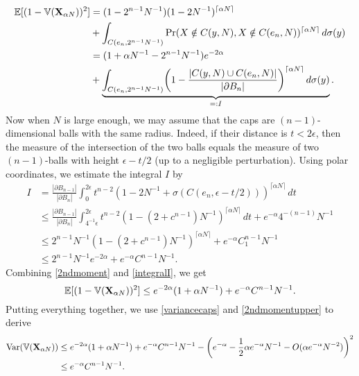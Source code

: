     \begin{align}\label{2ndmoment}
        \E[(1-\mathbb{V}(\mathbf{X}_{\alpha N}))^2] &= (1-2^{n-1}N^{-1})(1-2N^{-1})^{\lceil\alpha N\rceil} \nonumber\\
&+ \int_{C(e_n,2^{n-1}N^{-1})}\Pr( X \notin C(y,N), X \notin C(e_n,N))^{\lceil\alpha N\rceil}\,d\sigma(y)  
       \nonumber \\
       & = (1+\alpha N^{-1}-2^{n-1}N^{-1})e^{-2\alpha} \nonumber\\
&+ \underbrace{\int_{C(e_n,2^{n-1}N^{-1})}\left(1 - \frac{| C(y,N) \cup C(e_n,N) |}{|\partial B_n|}\right)^{\lceil\alpha N\rceil}\,d\sigma(y)}_{=:I}.
    \end{align}
    Now when $N$ is large enough, we may assume that the caps are $(n-1)$-dimensional balls with the same radius. Indeed, if their distance is $t < 2\epsilon$, then the measure of the intersection of the two balls equals the measure of two $(n-1)$-balls with height $\epsilon - t/2$ (up to a negligible perturbation). Using polar coordinates, we  estimate the  integral $I$ by
    \begin{align}\label{integralI}
         I &=  \frac{|\partial B_{n-1}|}{|\partial B_n|}\int_{0}^{2\epsilon}t^{n-2}(1-2N^{-1}+\sigma(C(e_n,\epsilon-t/2)))^{\lceil\alpha N\rceil}\, dt
        \nonumber \\& \leq  \frac{|\partial B_{n-1}|}{|\partial B_n|}\int_{4^{-1}\epsilon}^{2\epsilon} t^{n-2}(1-(2+c^{n-1})N^{-1})^{\lceil\alpha N\rceil}\,dt + e^{-\alpha}4^{-(n-1)}N^{-1}
       \nonumber\\& \leq    2^{n-1}N^{-1}(1-(2+ c^{n-1})N^{-1})^{\lceil\alpha N\rceil}+e^{-\alpha}C_1^{n-1}N^{-1} 
       \nonumber\\&\leq 2^{n-1}N^{-1}e^{-2\alpha} + e^{-\alpha}C^{n-1}N^{-1}. 
    \end{align}
  Combining \eqref{2ndmoment} and \eqref{integralI}, we get 
    \begin{equation}\label{2ndmomentupper}
        \E[(1-\mathbb{V}(\mathbf{X}_{\alpha N}))^2] \leq e^{-2\alpha}(1+\alpha N^{-1}) + e^{-\alpha}C^{n-1}N^{-1}. %
    \end{equation}
    Putting everything together, we use \eqref{variancecaps} and \eqref{2ndmomentupper} to derive 
    \begin{align*}
\var(\mathbb{V}(\mathbf{X}_{\alpha N}))%
&\leq e^{-2\alpha}(1+\alpha N^{-1}) + e^{-\alpha}C^{n-1}N^{-1}-\left(e^{-\alpha} - \frac{1}{2}\alpha e^{-\alpha} N^{-1} -O( \alpha e^{-\alpha} N^{-2})\right)^2\\
&\leq e^{-\alpha}C^{n-1}N^{-1}.
    \end{align*}
